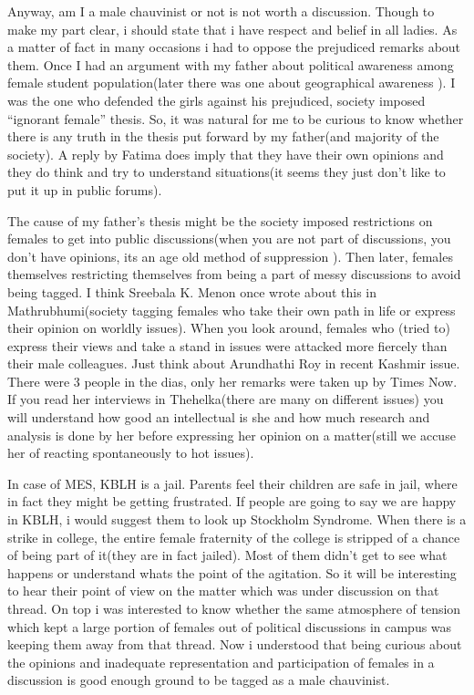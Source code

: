 Anyway, am I a male chauvinist or not is not worth a discussion. Though to make my part clear, i should state that i have respect and belief in all ladies. As a matter of fact in many occasions i had to oppose the prejudiced remarks about them. Once I had an argument with my father about political awareness among female student population(later there was one about geographical awareness  ). I was the one who defended the girls against his prejudiced, society imposed “ignorant female” thesis. So, it was natural for me to be curious to know whether there is any truth in the thesis put forward by my father(and majority of the society). A reply by Fatima does imply that they have their own opinions and they do think and try to understand situations(it seems they just don’t like to put it up in public forums).

The cause of my father’s thesis might be the society imposed restrictions on females to get into public discussions(when you are not part of discussions, you don’t have opinions, its an age old method of suppression  ). Then later, females themselves restricting themselves from being a part of messy discussions to avoid being tagged. I think Sreebala K. Menon once wrote about this in Mathrubhumi(society tagging females who take their own path in life or express their opinion on worldly issues). When you look around, females who (tried to) express their views and take a stand in issues were attacked more fiercely than their male colleagues. Just think about Arundhathi Roy in recent Kashmir issue. There were 3 people in the dias, only her remarks were taken up by Times Now. If you read her interviews in Thehelka(there are many on different issues) you will understand how good an intellectual is she and how much research and analysis is done by her before expressing her opinion on a matter(still we accuse her of reacting spontaneously to hot issues).

In case of MES, KBLH is a jail. Parents feel their children are safe in jail, where in fact they might be getting frustrated. If people are going to say we are happy in KBLH, i would suggest them to look up Stockholm Syndrome. When there is a strike in college, the entire female fraternity of the college is stripped of a chance of being part of it(they are in fact jailed). Most of them didn’t get to see what happens or understand whats the point of the agitation. So it will be interesting to hear their point of view on the matter which was under discussion on that thread. On top i was interested to know whether the same atmosphere of tension which kept a large portion of females out of political discussions in campus was keeping them away from that thread. Now i understood that being curious about the opinions and inadequate representation and participation of females in a discussion is good enough ground to be tagged as a male chauvinist.

